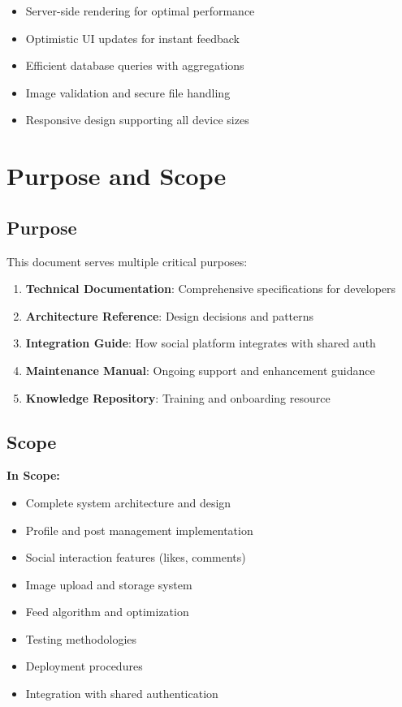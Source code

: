 \documentclass[12pt,a4paper]{report}
\begin{document}
\begin{itemize}
    \item Server-side rendering for optimal performance
    \item Optimistic UI updates for instant feedback
    \item Efficient database queries with aggregations
    \item Image validation and secure file handling
    \item Responsive design supporting all device sizes
\end{itemize}

\section{Purpose and Scope}

\subsection{Purpose}

This document serves multiple critical purposes:

\begin{enumerate}
    \item \textbf{Technical Documentation}: Comprehensive specifications for developers
    \item \textbf{Architecture Reference}: Design decisions and patterns
    \item \textbf{Integration Guide}: How social platform integrates with shared auth
    \item \textbf{Maintenance Manual}: Ongoing support and enhancement guidance
    \item \textbf{Knowledge Repository}: Training and onboarding resource
\end{enumerate}

\subsection{Scope}

\textbf{In Scope:}
\begin{itemize}
    \item Complete system architecture and design
    \item Profile and post management implementation
    \item Social interaction features (likes, comments)
    \item Image upload and storage system
    \item Feed algorithm and optimization
    \item Testing methodologies
    \item Deployment procedures
    \item Integration with shared authentication
\end{itemize}
\end{document}
